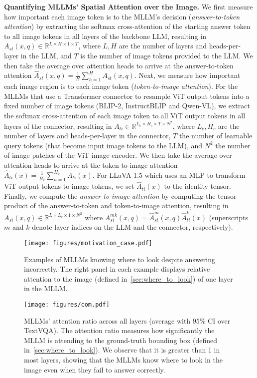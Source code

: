 \textbf{Quantifying MLLMs' Spatial Attention over the Image.} We first measure how important each image token is to the MLLM's decision (\emph{answer-to-token attention}) by extracting the softmax cross-attention of the starting answer token to all image tokens in all layers of the backbone LLM, resulting in $A_{st}(x,q) \in \mathbb{R}^{L \times H \times 1 \times T}$, where $L, H$ are the number of layers and heads-per-layer in the LLM, and $T$ is the number of image tokens provided to the LLM. We then take the average over attention heads to arrive at the answer-to-token attention $\hat{A}_{st}(x,q) = \frac{1}{H}\sum_{h=1}^H A_{st}(x,q)$.
Next, we measure how important each image region is to each image token (\emph{token-to-image attention}). For the MLLMs that use a Transformer connector to resample ViT output tokens into a fixed number of image tokens (BLIP-2, InstructBLIP and Qwen-VL), we extract the softmax cross-attention of each image token to all ViT output tokens in all layers of the connector, resulting in $A_{ti} \in \mathbb{R}^{L_c \times H_c \times T \times N^2}$, where $L_c, H_c$ are the number of layers and heads-per-layer in the connector, $T$ the number of learnable query tokens (that become input image tokens to the LLM), and $N^2$ the number of image patches of the ViT image encoder. We then take the average over attention heads to arrive at the token-to-image attention $\hat{A}_{ti}(x) = \frac{1}{H_c}\sum_{h=1}^{H_c} A_{ti} (x)$. For LLaVA-1.5 which uses an MLP to transform ViT output tokens to image tokens, we set $\hat{A}_{ti}(x)$ to the identity tensor.
Finally, we compute the \emph{answer-to-image attention} by computing the tensor product of the answer-to-token and token-to-image attention, resulting in $A_{si}(x,q)\in \mathbb{R}^{L\times L_c \times 1 \times N^2}$ where $A^{mk}_{si}(x,q) = \hat{A}_{st}^m(x,q) \hat{A}_{ti}^k(x)$ (superscripts $m$ and $k$ denote layer indices on the LLM and the connector, respectively).

\begin{figure*}[t!]
    \texttt{[image: figures/motivation\_case.pdf]}
    \caption{Examples of MLLMs knowing where to look despite answering incorrectly. The right panel in each example displays relative attention to the image (defined in~\cref{sec:where_to_look}) of one layer in the MLLM.}
    \label{fig:motivation_case}
    \vspace{-1.5em}
\end{figure*}

\begin{figure*}[b!]
    \centering
    \texttt{[image: figures/com.pdf]}
    \caption{MLLMs' attention ratio across all layers (average with $95\%$ CI over TextVQA). The attention ratio measures how significantly the MLLM is attending to the ground-truth bounding box (defined in~\cref{sec:where_to_look}). We observe that it is greater than 1 in most layers, showing that the MLLMs know where to look in the image even when they fail to answer correctly.}
    \label{fig:where_to_look}
\end{figure*}

